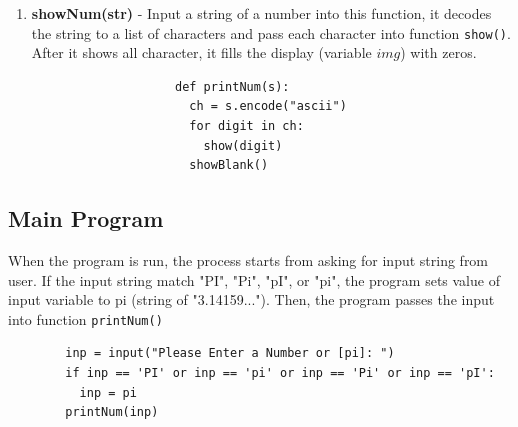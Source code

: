 \documentclass[12pt]{article}
\begin{document}
\begin{enumerate}
			\item \textbf{showNum(str)} - Input a string of a number into this function, it decodes the string to  a list of characters and pass each character into function \texttt{show()}. After it shows all character, it fills the display (variable $img$) with zeros.
				\begin{verbatim}
					def printNum(s):
					  ch = s.encode("ascii")
					  for digit in ch:
					    show(digit)
					  showBlank()
				\end{verbatim}
		\end{enumerate}

	\subsection{Main Program}
	When the program is run, the process starts from asking for input string from user. If the input string match "PI", "Pi", "pI", or "pi", the program sets value of input variable to pi (string of "3.14159..."). Then, the program passes the input into function \texttt{printNum()}
	\begin{verbatim}
		inp = input("Please Enter a Number or [pi]: ")
		if inp == 'PI' or inp == 'pi' or inp == 'Pi' or inp == 'pI':
		  inp = pi
		printNum(inp)
	\end{verbatim}
\end{document}
